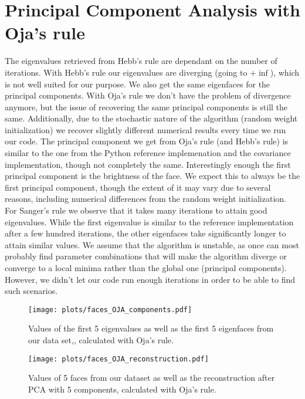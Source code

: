 \documentclass[a4paper,10pt]{article} %
\begin{document}
\section{Principal Component Analysis with Oja’s rule}
The eigenvalues retrieved from Hebb's rule are dependant on the number of iterations. With Hebb's rule our eigenvalues are diverging (going to $+\inf$), which is not well suited for our purpose. We also get the same eigenfaces for the principal components. With Oja's rule we don't have the problem of divergence anymore, but the issue of recovering the same principal components is still the same. Additionally, due to the stochastic nature of the algorithm (random weight initialization) we recover slightly different numerical results every time we run our code. The principal component we get from Oja's rule (and Hebb's rule) is similar to the one from the Python reference implemenation and the covariance implementation, though not completely the same. Interestingly enough the first principal component is the brightness of the face. We expect this to always be the first principal component, though the extent of it may vary due to several reasons, including numerical differences from the random weight initialization. 
For Sanger's rule we observe that it takes many iterations to attain good eigenvalues. While the first eigenvalue is similar to the reference implementation after a few hundred iterations, the other eigenfaces take significantly longer to attain similar values. We assume that the algorithm is unstable, as once can most probably find parameter combinations that will make the algorithm diverge or converge to a local minima rather than the global one (principal components). However, we didn't let our code run enough iterations in order to be able to find such scenarios. 

\begin{figure}[h]
  \centering
  \begin{minipage}[t]{0.7\textwidth}
    \texttt{[image: plots/faces\_OJA\_components.pdf]}
    \caption{Values of the first 5 eigenvalues as well as the first 5 eigenfaces from our data set,, calculated with Oja's rule.}
    \label{fig:faces_recon}
  \end{minipage}
  \hfill
  \begin{minipage}[t]{0.7\textwidth}
    \texttt{[image: plots/faces\_OJA\_reconstruction.pdf]}
    \caption{Values of 5 faces from our dataset as well as the reconstruction after PCA with 5 components, calculated with Oja's rule.}
    \label{fig:faces_recon_python}
  \end{minipage}
\end{figure}

\bigskip

\printbibliography

\end{document}
